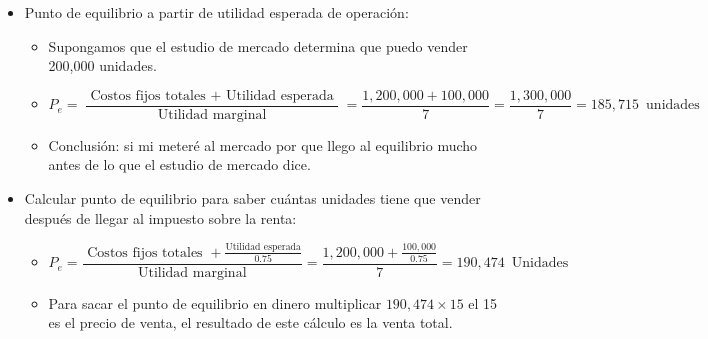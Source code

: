 \begin{itemize}
    \item Punto de equilibrio a partir de utilidad esperada de operación:
        \begin{itemize}
            \item Supongamos que el estudio de mercado determina que puedo vender 200,000 unidades.
            
            \item \[
                P_e = \frac{\text{  Costos fijos totales  } + \text{  Utilidad esperada  }}{\text{  Utilidad marginal  }} = \frac{1,200,000 + 100,000}{7} = \frac{1,300,000}{7} = 185,715 \, \text{  unidades  } 
              \]
            
            \item Conclusión: si mi meteré al mercado por que llego al equilibrio mucho antes de lo que el estudio de mercado dice.
        \end{itemize}

    
    \item Calcular punto de equilibrio para saber cuántas unidades tiene que vender después de llegar al impuesto sobre la renta:
        \begin{itemize}
            \item \[
                P_e = \frac{\text{  Costos fijos totales  } + \frac{\text{Utilidad esperada}}{0.75} }{\text{  Utilidad marginal  }} = \frac{1,200,000 + \frac{100,000}{0.75}}{7} = 190,474\, \text{  Unidades  } 
            \] 
            
            \item Para sacar el punto de equilibrio en dinero multiplicar $190,474\times15$ el 15 es el precio de venta, el resultado de este cálculo es la venta total.
        \end{itemize}
    

\end{itemize}
